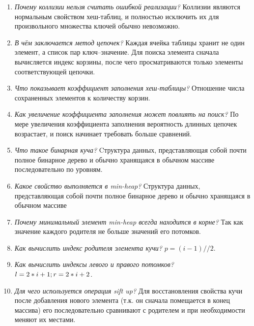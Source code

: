 \begin{enumerate}
	\item \textit{Почему коллизии нельзя считать ошибкой реализации?}\newline
	Коллизии являются нормальным свойством хеш-таблиц, и полностью исключить их для произвольного множества ключей обычно невозможно.
	\item \textit{В чём заключается метод цепочек?}\newline
	Каждая ячейка таблицы хранит не один элемент, а список пар ключ--значение. Для поиска элемента сначала вычисляется индекс корзины, после чего просматриваются только элементы соответствующей цепочки.
	\item \textit{Что показывает коэффициент заполнения хеш-таблицы?}\newline
	Отношение числа сохраненных элементов к количеству корзин. 
	\item \textit{Как увеличение коэффициента заполнения может повлиять на поиск?}\newline
	По мере увеличения коэффициента заполнения вероятность длинных цепочек возрастает, и поиск начинает требовать больше сравнений.
	\item \textit{Что такое бинарная куча?}\newline
	Cтруктура данных, представляющая собой почти полное бинарное дерево и обычно хранящаяся в обычном массиве последовательно по уровням.
	\item \textit{Какое свойство выполняется в min-heap?}\newline
	Структура данных, представляющая собой почти полное бинарное дерево и обычно хранящаяся в обычном массиве
	\item \textit{Почему минимальный элемент min-heap всегда находится в корне?}\newline
	Так как значение каждого родителя не больше значений его потомков.
	\item \textit{Как вычислить индекс родителя элемента кучи?}\newline
	$p = (i - 1) // 2$.
	\item \textit{Как вычислить индексы левого и правого потомков?}\newline
	$l = 2 * i + 1; \\r = 2 * i + 2$.
	\item \textit{Для чего используется операция sift up?}\newline
	Для восстановления свойства кучи после добавления нового элемента (т.к. он сначала помещается в конец массива) его последовательно сравнивают с родителем и при необходимости меняют их местами.

\end{enumerate}
